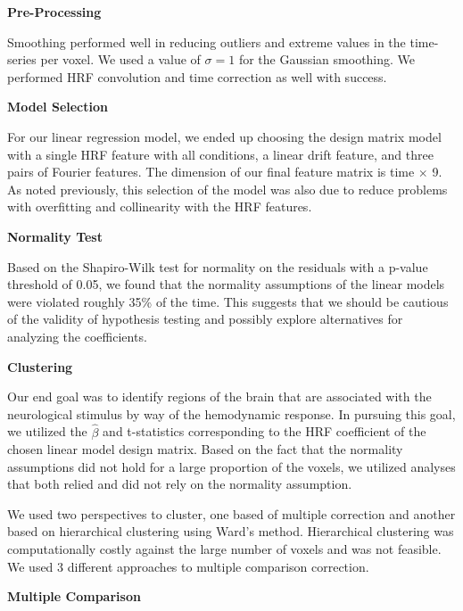 
\noindent \textbf{Pre-Processing}

Smoothing performed well in reducing outliers and extreme values in the 
time-series per voxel. We used a value of $\sigma=1$ for the Gaussian 
smoothing. We performed HRF convolution and time correction as well with 
success.
\vspace{5mm}

\noindent \textbf{Model Selection}

For our linear regression model, we ended up choosing the design matrix model 
with a single HRF feature with all conditions, a linear drift feature, and 
three pairs of Fourier features. The dimension of our final feature matrix is 
time $\times$ 9. As noted previously, this selection of the model was also 
due to reduce problems with overfitting and collinearity with the HRF features.
\vspace{5mm}

\noindent \textbf{Normality Test}

Based on the Shapiro-Wilk test for normality on the residuals with a p-value 
threshold of 0.05, we found that the normality assumptions of the linear 
models were violated roughly 35\% of the time. This suggests that we should be 
cautious of the validity of hypothesis testing and possibly explore 
alternatives for analyzing the coefficients.
\vspace{5mm}

\noindent \textbf{Clustering}

Our end goal was to identify regions of the brain that are associated with the 
neurological stimulus by way of the hemodynamic response. In pursuing this 
goal, we utilized the $\hat{\beta}$ and t-statistics corresponding to the HRF 
coefficient of the chosen linear model design matrix. Based on the fact that 
the normality assumptions did not hold for a large proportion of the voxels, 
we utilized analyses that both relied and did not rely on the normality 
assumption.

We used two perspectives to cluster, one based of multiple correction and 
another based on hierarchical clustering using Ward's method. Hierarchical 
clustering was computationally costly against the large number of voxels and 
was not feasible. We used 3 different approaches to multiple comparison 
correction. 
\vspace{5mm}

\noindent \textbf{Multiple Comparison}

